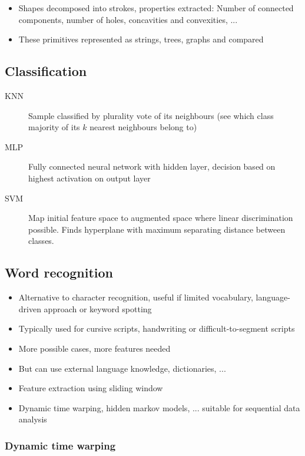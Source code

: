 \begin{itemize}
		\item Shapes decomposed into strokes, properties extracted: Number of
				connected components, number of holes, concavities and
				convexities, ...
		\item These primitives represented as strings, trees, graphs and compared
\end{itemize}

\subsection{Classification}

\begin{description}
		\item[KNN] Sample classified by plurality vote of its neighbours (see
				which class majority of its $k$ nearest neighbours belong to)
		\item[MLP] Fully connected neural network with hidden layer, decision
				based on highest activation on output layer
		\item[SVM] Map initial feature space to augmented space where linear
				discrimination possible. Finds hyperplane with maximum
				separating distance between classes.
\end{description}

\subsection{Word recognition}

\begin{itemize}
		\item Alternative to character recognition, useful if limited
				vocabulary, language-driven approach or keyword spotting
		\item Typically used for cursive scripts, handwriting or
				difficult-to-segment scripts
		\item More possible cases, more features needed
		\item But can use external language knowledge, dictionaries, ...
		\item Feature extraction using sliding window
		\item Dynamic time warping, hidden markov models, ... suitable for
				sequential data analysis
\end{itemize}

\subsubsection{Dynamic time warping}

